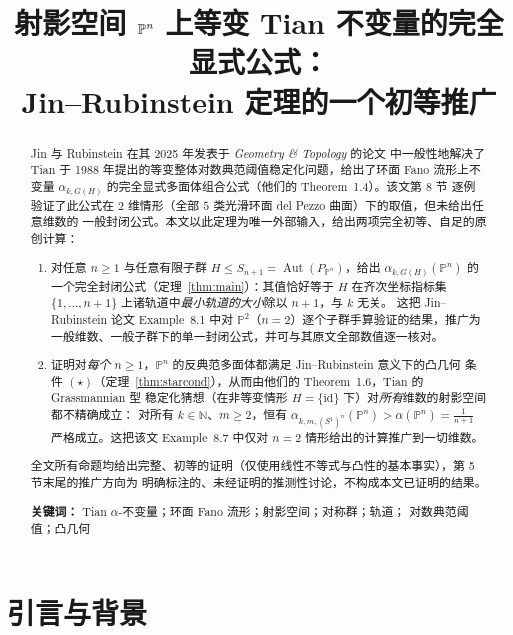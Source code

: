 \documentclass[11pt,a4paper]{article}
\title{\textbf{射影空间 $\PP^n$ 上等变 Tian 不变量的完全显式公式：\\
Jin--Rubinstein 定理的一个初等推广}}
\author{}
\date{}
\theoremstyle{definition}
\theoremstyle{remark}
\DeclareMathOperator{\Aut}{Aut}
\newcommand{\N}{\mathbb{N}}
\newcommand{\PP}{\mathbb{P}}
\begin{document}
\maketitle
\vspace{-1.5em}

\begin{abstract}
Jin 与 Rubinstein 在其 2025 年发表于 \emph{Geometry \& Topology} 的论文
\cite{JR2025} 中一般性地解决了 Tian 于 1988 年提出的等变整体对数典范阈值稳定化问题，给出了环面
Fano 流形上不变量 $\alpha_{k,G(H)}$ 的完全显式多面体组合公式（他们的 Theorem~1.4）。该文第 8 节
逐例验证了此公式在 $2$ 维情形（全部 $5$ 类光滑环面 del Pezzo 曲面）下的取值，但未给出任意维数的
一般封闭公式。本文以此定理为唯一外部输入，给出两项完全初等、自足的原创计算：

\begin{enumerate}[leftmargin=1.8em]
  \item 对任意 $n \ge 1$ 与任意有限子群 $H \le S_{n+1} = \Aut(P_{\PP^n})$，给出
  $\alpha_{k,G(H)}(\PP^n)$ 的一个完全封闭公式（定理~\ref{thm:main}）：其值恰好等于
  $H$ 在齐次坐标指标集 $\{1,\dots,n+1\}$ 上诸轨道中\emph{最小轨道的大小}除以 $n+1$，与 $k$ 无关。
  这把 Jin--Rubinstein 论文 Example~8.1 中对 $\PP^2$（$n=2$）逐个子群手算验证的结果，推广为
  一般维数、一般子群下的单一封闭公式，并可与其原文全部数值逐一核对。
  \item 证明对\emph{每个} $n \ge 1$，$\PP^n$ 的反典范多面体都满足 Jin--Rubinstein 意义下的凸几何
  条件 $(\star)$（定理~\ref{thm:starcond}），从而由他们的 Theorem~1.6，Tian 的 Grassmannian 型
  稳定化猜想（在非等变情形 $H=\{\mathrm{id}\}$ 下）对\emph{所有}维数的射影空间都不精确成立：
  对所有 $k \in \N$、$m \ge 2$，恒有 $\alpha_{k,m,(S^1)^n}(\PP^n) > \alpha(\PP^n) = \tfrac{1}{n+1}$
  严格成立。这把该文 Example~8.7 中仅对 $n=2$ 情形给出的计算推广到一切维数。
\end{enumerate}

全文所有命题均给出完整、初等的证明（仅使用线性不等式与凸性的基本事实），第 5 节末尾的推广方向为
明确标注的、未经证明的推测性讨论，不构成本文已证明的结果。

\medskip
\noindent\textbf{关键词：} Tian $\alpha$-不变量；环面 Fano 流形；射影空间；对称群；轨道；
对数典范阈值；凸几何
\end{abstract}

\tableofcontents

\section{引言与背景}
\end{document}
